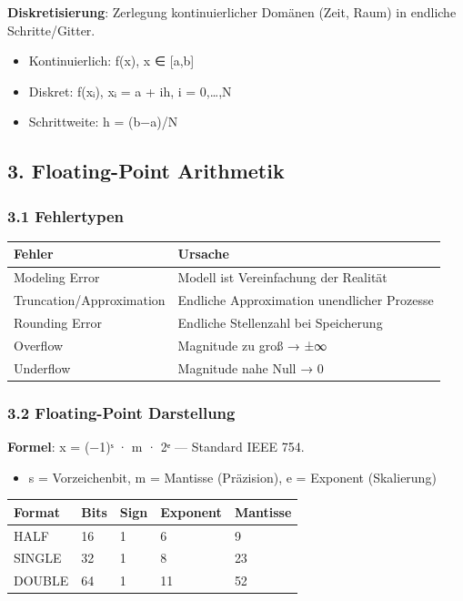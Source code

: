 \documentclass[11pt, a4paper]{article}
\begin{document}
\textbf{Diskretisierung}: Zerlegung kontinuierlicher Domänen (Zeit, Raum) in endliche Schritte/Gitter.

\begin{itemize}
  \item Kontinuierlich: f(x), x ∈ [a,b]
  \item Diskret: f(xᵢ), xᵢ = a + ih, i = 0,…,N
  \item Schrittweite: h = (b−a)/N
\end{itemize}


\subsection{3. Floating-Point Arithmetik}


\subsubsection{3.1 Fehlertypen}


{\small
\begin{tabularx}{\linewidth}{XX}
\hline
\rowcolor{tableheadbg}
{\color{white}\textbf{Fehler}} & {\color{white}\textbf{Ursache}} \\[2pt]
\hline
\endhead
\hline
\endfoot
Modeling Error & Modell ist Vereinfachung der Realität \\
Truncation/Approximation & Endliche Approximation unendlicher Prozesse \\
Rounding Error & Endliche Stellenzahl bei Speicherung \\
Overflow & Magnitude zu groß → ±∞ \\
Underflow & Magnitude nahe Null → 0 \\
\end{tabularx}
}



\subsubsection{3.2 Floating-Point Darstellung}

\textbf{Formel}: x = (−1)ˢ · m · 2ᵉ — Standard IEEE 754.

\begin{itemize}
  \item s = Vorzeichenbit, m = Mantisse (Präzision), e = Exponent (Skalierung)
\end{itemize}


{\small
\begin{tabularx}{\linewidth}{XXXXX}
\hline
\rowcolor{tableheadbg}
{\color{white}\textbf{Format}} & {\color{white}\textbf{Bits}} & {\color{white}\textbf{Sign}} & {\color{white}\textbf{Exponent}} & {\color{white}\textbf{Mantisse}} \\[2pt]
\hline
\endhead
\hline
\endfoot
HALF & 16 & 1 & 6 & 9 \\
SINGLE & 32 & 1 & 8 & 23 \\
DOUBLE & 64 & 1 & 11 & 52 \\
\end{tabularx}
}
\end{document}
